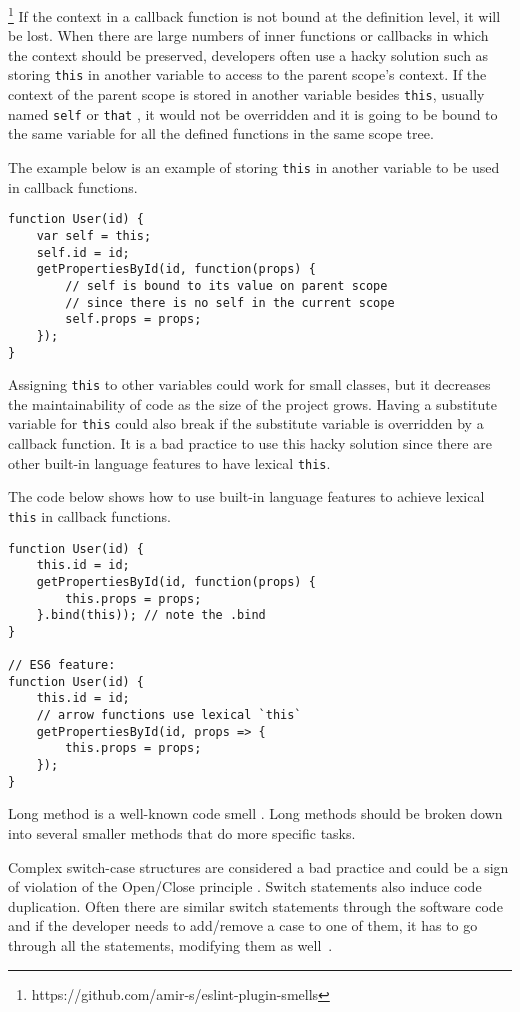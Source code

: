 \footnote{https://github.com/amir-s/eslint-plugin-smells} If the context in a callback function is not bound at the definition level, it will be lost. When there are large numbers of inner functions or callbacks in which the context should be preserved, developers often use a hacky solution such as storing \texttt{this} in another variable to access to the parent scope's context. If the context of the parent scope is stored in another variable besides \texttt{this}, usually named \texttt{self} or \texttt{that} \cite{crockford2008javascript}, it would not be overridden and it is going to be bound to the same variable for all the defined functions in the same scope tree.

The example below is an example of storing \texttt{this} in another variable to be used in callback functions.

\begin{lstlisting}
function User(id) {
	var self = this;
	self.id = id;
	getPropertiesById(id, function(props) {
		// self is bound to its value on parent scope
		// since there is no self in the current scope
		self.props = props;
	});
}
\end{lstlisting}

Assigning \texttt{this} to other variables could work for small classes, but it decreases the maintainability of code as the size of the project grows. Having a substitute variable for \texttt{this} could also break if the substitute variable is overridden by a callback function. It is a bad practice to use this hacky solution since there are other built-in language features to have lexical \texttt{this}.

The code below shows how to use built-in language features to achieve lexical \texttt{this} in callback functions.
\begin{lstlisting}
function User(id) {
	this.id = id;
	getPropertiesById(id, function(props) {
		this.props = props;
	}.bind(this)); // note the .bind
}

// ES6 feature:
function User(id) {
	this.id = id;
	// arrow functions use lexical `this`
	getPropertiesById(id, props => {
		this.props = props;
	});
}
\end{lstlisting}

 Long method is a well-known code smell \cite{marinescu2006object, fard2013jsnose, fontana2012automatic}. Long methods should be broken down into several smaller methods that do more specific tasks.

 Complex switch-case structures are considered a bad practice and could be a sign of violation of the Open/Close principle \cite{martin1996open}. Switch statements also induce code duplication. Often there are similar switch statements through the software code and if the developer needs to add/remove a case to one of them, it has to go through all the statements, modifying them as well~\cite{martin1999refactoring, kerievsky2005refactoring, fard2013jsnose}.

